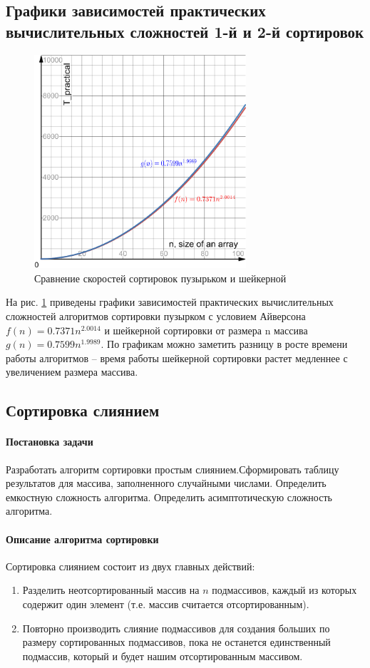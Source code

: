 \documentclass[a4paper, 14pt]{extarticle}
\begin{document}
\subsection{Графики зависимостей практических вычислительных сложностей 1-й и 2-й сортировок}
\begin{figure}[htpb]
  \centering
  \includegraphics[width=0.7\textwidth]{pictures/first_comp_graph_test.png}
  \caption{Сравнение скоростей сортировок пузырьком и шейкерной}
  \label{fig:graph_first}
\end{figure}
На рис. \ref{fig:graph_first} приведены графики зависимостей практических
вычислительных сложностей алгоритмов сортировки пузырком с
условием Айверсона $f(n) = 0.7371n^{2.0014}$ и шейкерной сортировки от размера
n массива $g(n) = 0.7599n^{1.9989}$. По графикам можно заметить разницу в росте времени работы
алгоритмов – время работы шейкерной сортировки растет медленнее с
увеличением размера массива.
\newpage
\subsection{Сортировка слиянием}
\paragraph{Постановка задачи}
Разработать алгоритм сортировки простым слиянием.Сформировать
таблицу результатов для массива, заполненного случайными числами.
Определить емкостную сложность алгоритма. Определить асимптотическую
сложность алгоритма.
\paragraph{Описание алгоритма сортировки}
Сортировка слиянием состоит из двух главных действий:
\begin{enumerate}
  \item Разделить неотсортированный массив на $n$ подмассивов, каждый
    из которых содержит один элемент (т.е. массив считается отсортированным).
  \item Повторно производить слияние подмассивов для создания больших по
    размеру сортированных подмассивов, пока не останется единственный подмассив,
    который и будет нашим отсортированным массивом.
\end{enumerate}
\newpage
\end{document}
